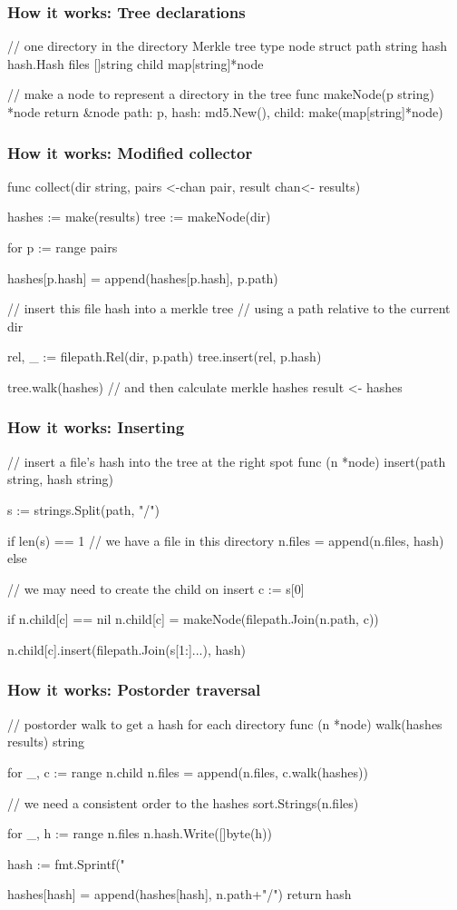 \documentclass[compress,t,11pt]{beamer}
\begin{document}
\begin{frame}[fragile]
    \frametitle{How it works: Tree declarations}
\begin{golang}
// one directory in the directory Merkle tree
type node struct {
	path  string
	hash  hash.Hash
	files []string
	child map[string]*node
}

// make a node to represent a directory in the tree
func makeNode(p string) *node {
	return &node{
        path:  p, 
        hash:  md5.New(), 
        child: make(map[string]*node)
    }
}
\end{golang}
\end{frame}

\begin{frame}[fragile]
    \frametitle{How it works: Modified collector}
\begin{golang}
func collect(dir string, pairs <-chan pair, 
             result chan<- results) {
	hashes := make(results)
	tree := makeNode(dir)

	for p := range pairs {
		hashes[p.hash] = append(hashes[p.hash], p.path)

		// insert this file hash into a merkle tree
        // using a path relative to the current dir

		rel, _ := filepath.Rel(dir, p.path)
		tree.insert(rel, p.hash)
	}

	tree.walk(hashes)  // and then calculate merkle hashes
	result <- hashes
}
\end{golang}
\end{frame}

\begin{frame}[fragile]
    \frametitle{How it works: Inserting}
\begin{golang}
// insert a file's hash into the tree at the right spot
func (n *node) insert(path string, hash string) {
	s := strings.Split(path, "/")

	if len(s) == 1 {
		// we have a file in this directory
		n.files = append(n.files, hash)
	} else {
		// we may need to create the child on insert
		c := s[0]

		if n.child[c] == nil {
			n.child[c] = makeNode(filepath.Join(n.path, c))
		}

		n.child[c].insert(filepath.Join(s[1:]...), hash)
	}
}
\end{golang}
\end{frame}

\begin{frame}[fragile]
    \frametitle{How it works: Postorder traversal}
\begin{golang}
// postorder walk to get a hash for each directory
func (n *node) walk(hashes results) string {
	for _, c := range n.child {
		n.files = append(n.files, c.walk(hashes))
	}

	// we need a consistent order to the hashes
	sort.Strings(n.files)

	for _, h := range n.files {
		n.hash.Write([]byte(h))
	}

	hash := fmt.Sprintf("%

	hashes[hash] = append(hashes[hash], n.path+"/")
	return hash
}
\end{golang}
\end{frame}
\end{document}
